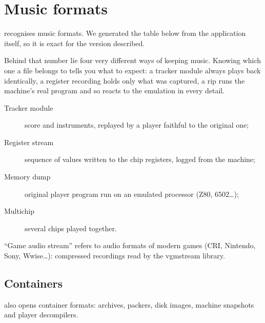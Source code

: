 \chapter{Music formats}
\soft recognises \lhunaModulesCount{} music formats. We generated the table below from the application itself, so it
is exact for the version described.

Behind that number lie four very different ways of keeping music. Knowing which one a file belongs to tells you what
to expect: a tracker module always plays back identically, a register recording holds only what was captured, a rip
runs the machine's real program and so reacts to the emulation in every detail.

\begin{description}
  \item[Tracker module] score and instruments, replayed by a player faithful to the original one;
  \item[Register stream] sequence of values written to the chip registers, logged from the machine;
  \item[Memory dump] original player program run on an emulated processor (Z80, 6502\dots);
  \item[Multichip] several chips played together.
\end{description}
``Game audio stream'' refers to audio formats of modern games (CRI, Nintendo, Sony, Wwise\dots): compressed recordings
read by the vgmstream library.

{\small\lhunaFormatsTable}

\section{Containers}
\soft also opens \lhunaContainersCount{} container formats: archives, packers, disk images, machine snapshots and
player decompilers.

{\small\lhunaContainersTable}
